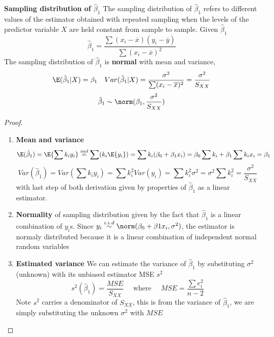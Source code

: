 \documentclass[11pt]{article}
\begin{document}
\begin{defn*}
	\textbf{Sampling distribution of $\hat{\beta}_1$} The sampling distribution of $\hat{\beta}_1$ refers to different values of the estimator obtained with repeated sampling when the levels of the predictor variable $X$ are held constant from sample to sample. Given $\hat{\beta}_1$ 
	\[
		\hat{\beta}_1 = \frac{\sum (x_i - \overline{x})(y_i - \overline{y})}{\sum (x_i - \overline{x})^2}
	\]
	The sampling distribution of $\hat{\beta}_1$ is \textbf{normal} with mean and variance,
	\[
		\E(\hat{\beta}_1 | X) = \beta_1 \quad Var(\hat{\beta}_1 | X) = \frac{\sigma^2}{\sum (x_i - \overline{x})^2} = \frac{\sigma^2}{S_{XX}}
	\]
	\[
		\hat{\beta}_1 \sim \norm(\beta_1, \frac{\sigma^2}{S_{XX}})
	\]
	\begin{proof}
		$ $\\
		\begin{enumerate}
			\item \textbf{Mean and variance}
			\[
				\E(\hat{\beta}_1) = \E\{ \sum k_i y_i \} \overset{ind}{=} \sum (k_i \E\{y_i \}) = \sum k_i(\beta_0 + \beta_1 x_i) = \beta_0 \sum k_i + \beta_1 \sum k_i x_i = \beta_1
			\]
			\[
				Var(\hat{\beta}_1) = Var\left( \sum k_i y_i \right) = \sum k_i^2 Var(y_i) = \sum k_i^2\sigma^2 = \sigma^2 \sum k_i^2 = \frac{\sigma^2}{S_{XX}}
			\]
			with last step of both derivation given by properties of $\hat{\beta}_1$ as a linear estimator. 
			\item \textbf{Normality} of sampling distribution given by the fact that $\hat{\beta}_1$ is a linear combination of $y_i$s. Since $y_i \overset{i.i.d}{\sim} \norm(\beta_0 + \beta1 x_i , \sigma^2)$, the estimator is normaly distributed because it is a linear combination of independent normal random variables
			\item \textbf{Estimated variance} We can estimate the variance of $\hat{\beta}_1$ by substituting $\sigma^2$ (unknown) with its unbiased estimator MSE $s^2$
			\[
				s^2 (\hat{\beta}_1) = \frac{MSE}{S_{XX}} \quad \text{ where } \quad MSE = \frac{\sum e_i^2}{n-2}
			\]
			Note $s^2$ carries a denominator of $S_{XX}$, this is from the variance of $\hat{\beta}_1$, we are simply substituting the unknown $\sigma^2$ with $MSE$
		\end{enumerate}
	\end{proof}
\end{defn*}
\end{document}
